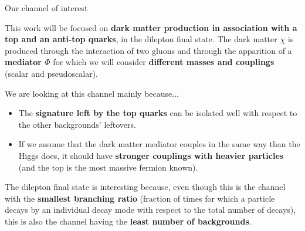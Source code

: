 \documentclass[8 pt]{beamer}
\begin{document}
\begin{frame}{Our channel of interest}

	\justifying
	This work will be focused on \textbf{dark matter production in association with a top and an anti-top quarks}, in the dilepton final state. The dark matter $\chi$ is produced through the interaction of two gluons and through the apparition of a \textbf{mediator $\Phi$} for which we will consider \textbf{different masses and couplings} (scalar and pseudoscalar). \\ \vspace{8pt} \vfill
	
	\begin{minipage}[c]{.39\linewidth}
   	\end{minipage} \hfill
   	\begin{minipage}[c]{.59\linewidth}
	\justifying
	\color{mycolor} We are looking at this channel mainly because... \color{black} 
	\begin{itemize}
	\justifying
	\item The \textbf{signature left by the top quarks} can be isolated well with respect to the other backgrounds' leftovers. \vfill
	\item If we assume that the dark matter mediator couples in the same way than the Higgs does, it should have \textbf{stronger couplings with heavier particles} (and the top is the most massive fermion known). \vfill
	\end{itemize}
   	\end{minipage} \hfill \vfill	
	
	\vspace{8pt}
	
	The dilepton final state is interesting because, even though this is the channel with the \textbf{smallest branching ratio} (fraction of times for which a particle decays by an individual decay mode with respect to the total number of decays), this is also the channel having the \textbf{least number of backgrounds}. \vfill

\end{frame}
\end{document}
